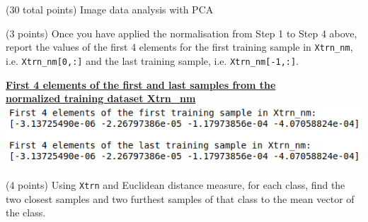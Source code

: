 \documentclass[12pt]{article}
\begin{document}
\clearpage
%
%

\begin{question}{(30 total points) Image data analysis with PCA}

  
  

  
  \medskip

  \begin{subquestion}{(3 points)
      Once you have applied the normalisation from Step 1 to Step 4 above,
      report the values of the first 4 elements for the first training
      sample in \texttt{Xtrn\_nm},
      i.e. \texttt{Xtrn\_nm[0,:]} and the last training sample,
      i.e. \texttt{Xtrn\_nm[-1,:]}.
    } \label{Q1.1}
    

      \begin{answerbox}{13em}
        \textbf{\large{\underline{First 4 elements of the first and last samples from the}}}\\
        \textbf{\large{\underline{normalized training dataset Xtrn\_nm}}}
        \vspace{0.3cm}\\
         \includegraphics[width=1\textwidth]{images/q11.png}
      \end{answerbox}
  


   \end{subquestion}
   \begin{subquestion}{(4 points)
      Using {\tt Xtrn} and Euclidean distance
      measure, for each class,
      find the two closest samples and two furthest
      samples of that class to the mean vector of the class.
    }  \label{Q1.2}





\end{subquestion}
\end{question}
\end{document}
